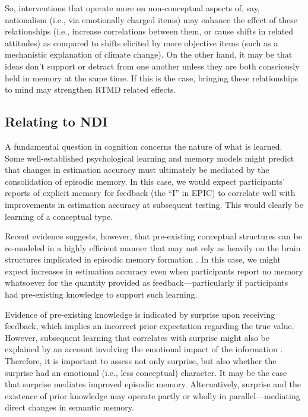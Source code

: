 So, interventions that operate more on non-conceptual aspects of, say,
nationalism (i.e., via emotionally charged items) may enhance the effect of
these relationships (i.e., increase correlations between them, or cause shifts in
related attitudes) as compared to shifts elicited by more objective items (such
as a mechanistic explanation of climate change).  On the other hand, it may be
that ideas don't support or detract from one another unless they are both
consciously held in memory at the same time. If this is the case, bringing these
relationships to mind may strengthen RTMD related effects.

\subsection{Relating to NDI}

A fundamental question in cognition concerns the nature of what is learned. Some
well-established psychological learning and memory models
\cite{nadel_memory_1997} might predict that changes in estimation accuracy must
ultimately be mediated by the consolidation of episodic memory. In this case, we
would expect participants' reports of explicit memory for feedback (the “I” in
EPIC) to correlate well with improvements in estimation accuracy at subsequent
testing.  This would clearly be learning of a conceptual type.

Recent evidence suggests, however, that pre-existing conceptual structures can
be re-modeled in a highly efficient manner that may not rely as heavily on the
brain structures implicated in episodic memory formation
\cite{tse_schemas_2007,clark_assembling_2003}. In this case, we might expect
increases in estimation accuracy even when participants report no memory
whatsoever for the quantity provided as feedback---particularly if participants
had pre-existing knowledge to support such learning.

Evidence of pre-existing knowledge is indicated by surprise upon receiving
feedback, which implies an incorrect prior expectation regarding the true value.
However, subsequent learning that correlates with surprise might also be
explained by an account involving the emotional impact of the information
\cite{munnich_surprise_2007,thagard_hot_2006}.  Therefore, it is important to
assess not only surprise, but also whether the surprise had an emotional (i.e.,
less conceptual) character. It may be the case that surprise mediates improved
episodic memory. Alternatively, surprise and the existence of prior knowledge
may operate partly or wholly in parallel---mediating direct changes in semantic
memory.

